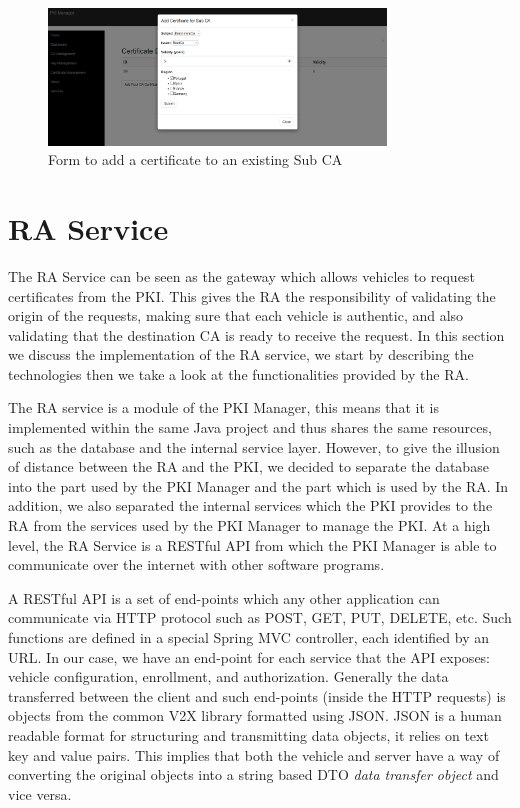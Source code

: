 \begin{figure}
	\centering
	\includegraphics[width=0.8\textwidth]{Figures/manager8}
	\caption{\label{fig:manager8}Form to add a certificate to an existing Sub CA}
\end{figure}

\section{RA Service}
The RA Service can be seen as the gateway which allows vehicles to request certificates from the PKI. This gives the RA the responsibility of validating the origin of the requests, making sure that each vehicle is authentic, and also validating that the destination CA is ready to receive the request. In this section we discuss the implementation of the RA service, we start by describing the technologies then we take a look at the functionalities provided by the RA.

The RA service is a module of the PKI Manager, this means that it is implemented within the same Java project and thus shares the same resources, such as the database and the internal service layer. However, to give the illusion of distance between the RA and the PKI, we decided to separate the database into the part used by the PKI Manager and the part which is used by the RA. In addition, we also separated the internal services which the PKI provides to the RA from the services used by the PKI Manager to manage the PKI. At a high level, the RA Service is a RESTful API from which the PKI Manager is able to communicate over the internet with other software programs. 

A RESTful API is a set of end-points which any other application can communicate via HTTP protocol such as POST, GET, PUT, DELETE, etc. Such functions are defined in a special Spring MVC controller, each identified by an URL. In our case, we have an end-point for each service that the API exposes: vehicle configuration, enrollment, and authorization. Generally the data transferred between the client and such end-points (inside the HTTP requests) is objects from the common V2X library formatted using JSON. JSON is a human readable format for structuring and transmitting data objects, it relies on text key and value pairs. This implies that both the vehicle and server have a way of converting the original objects into a string based DTO \textit{data transfer object} and vice versa.

